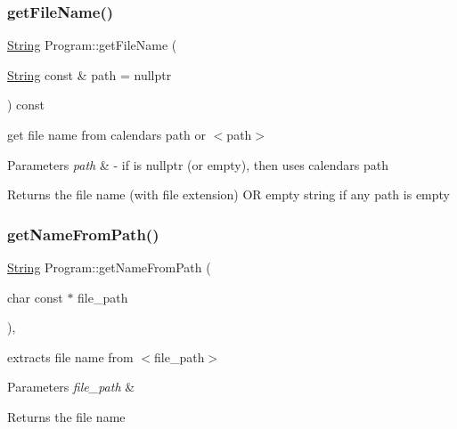 \subsubsection{\texorpdfstring{get\+File\+Name()}{getFileName()}}
{\footnotesize\ttfamily \hyperlink{classString}{String} Program\+::get\+File\+Name (\begin{DoxyParamCaption}\item[{\hyperlink{classString}{String} const \&}]{path = {\ttfamily nullptr} }\end{DoxyParamCaption}) const}

get file name from calendar\textquotesingle{}s path or $<$path$>$ 
\begin{DoxyParams}{Parameters}
{\em path} & -\/ if is nullptr (or empty), then uses calendar\textquotesingle{}s path \\
\hline
\end{DoxyParams}
\begin{DoxyReturn}{Returns}
the file name (with file extension) OR empty string if any path is empty 
\end{DoxyReturn}
\mbox{\label{classProgram_a5b0f8b7d9437d17ebc2e851d345f4a9b}} 
\subsubsection{\texorpdfstring{get\+Name\+From\+Path()}{getNameFromPath()}}
{\footnotesize\ttfamily \hyperlink{classString}{String} Program\+::get\+Name\+From\+Path (\begin{DoxyParamCaption}\item[{char const $\ast$}]{file\+\_\+path }\end{DoxyParamCaption})\hspace{0.3cm}{\ttfamily [static]}, {\ttfamily [private]}}

extracts file name from $<$file\+\_\+path$>$ 
\begin{DoxyParams}{Parameters}
{\em file\+\_\+path} & \\
\hline
\end{DoxyParams}
\begin{DoxyReturn}{Returns}
the file name 
\end{DoxyReturn}
\mbox{\label{classProgram_ad14086e73ec4aef58c705e3a19089d97}} 
